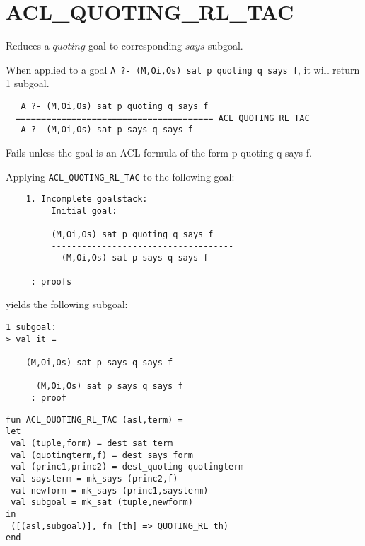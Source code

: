 \SEEALSO
\ENDDOC

\section{ACL\_QUOTING\_RL\_TAC}



\egroup


\SYNOPSIS
Reduces a $quoting$ goal to corresponding $says$ subgoal.

\DESCRIBE When applied to a goal \texttt{A ?- (M,Oi,Os) sat p quoting q says f}, it will return 1 subgoal.
\begin{verbatim}
   A ?- (M,Oi,Os) sat p quoting q says f
  ======================================= ACL_QUOTING_RL_TAC
   A ?- (M,Oi,Os) sat p says q says f
\end{verbatim}

\FAILURE 
Fails unless the goal is an ACL formula of the form p quoting q says f.

\EXAMPLE
Applying \texttt{ACL\_QUOTING\_RL\_TAC} to the following goal:
\begin{holboxed}
\begin{verbatim}
    1. Incomplete goalstack:
         Initial goal:
    
         (M,Oi,Os) sat p quoting q says f
         ------------------------------------
           (M,Oi,Os) sat p says q says f
    
     : proofs
\end{verbatim}
\end{holboxed}
yields the following subgoal:
\begin{holboxed}
\begin{verbatim}
1 subgoal:
> val it =
    
    (M,Oi,Os) sat p says q says f
    ------------------------------------
      (M,Oi,Os) sat p says q says f
     : proof
\end{verbatim}
\end{holboxed}

\IMPLEMENTATION
\begin{holboxed}
\begin{verbatim}
fun ACL_QUOTING_RL_TAC (asl,term) =
let
 val (tuple,form) = dest_sat term
 val (quotingterm,f) = dest_says form
 val (princ1,princ2) = dest_quoting quotingterm
 val saysterm = mk_says (princ2,f)
 val newform = mk_says (princ1,saysterm)
 val subgoal = mk_sat (tuple,newform)
in
 ([(asl,subgoal)], fn [th] => QUOTING_RL th)
end
\end{verbatim}
\end{holboxed}

